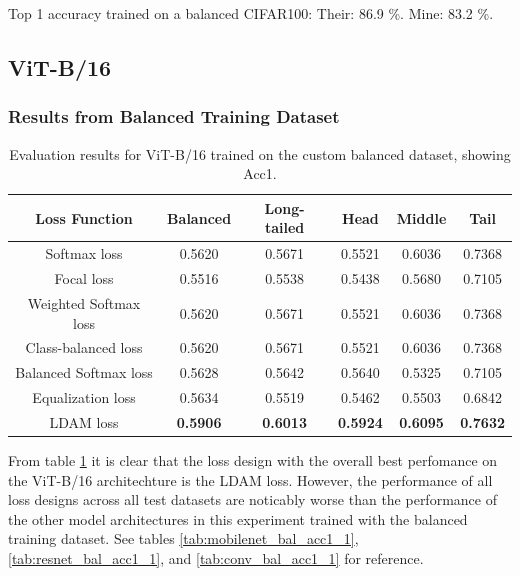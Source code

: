 Top 1 accuracy trained on a balanced CIFAR100:
Their: 86.9 \%.
Mine: 83.2 \%.


\subsection{ViT-B/16}

\subsubsection{Results from Balanced Training Dataset}

\begin{table}[H]
    \centering
    \caption{Evaluation results for ViT-B/16 trained on the custom balanced dataset, showing Acc1.}
    \begin{tabular}{cccccc}
        \toprule
        Loss Function & Balanced & Long-tailed & Head & Middle & Tail \\ 
        \midrule
        Softmax loss   & 0.5620 & 0.5671 & 0.5521 & 0.6036 & 0.7368 \\
        Focal loss   & 0.5516 & 0.5538 & 0.5438 & 0.5680 & 0.7105 \\
        Weighted Softmax loss   & 0.5620 & 0.5671 & 0.5521 & 0.6036 & 0.7368 \\
        Class-balanced loss   & 0.5620 & 0.5671 &  0.5521 & 0.6036 & 0.7368 \\
        Balanced Softmax loss   & 0.5628 & 0.5642 & 0.5640 & 0.5325 & 0.7105 \\
        Equalization loss   & 0.5634   & 0.5519 & 0.5462 & 0.5503 & 0.6842 \\
        LDAM loss   & \textbf{0.5906} &  \textbf{0.6013} & \textbf{0.5924} & \textbf{0.6095} & \textbf{0.7632} \\
        \bottomrule
    \end{tabular}
    \label{tab:vit_bal_acc1_1}
\end{table}

From table \ref{tab:vit_bal_acc1_1} it is clear that the loss design with the overall best perfomance on the ViT-B/16 architechture is the LDAM loss. However, the performance of all loss designs across all test datasets are noticably worse than the performance of the other model architectures in this experiment trained with the balanced training dataset. See tables \ref{tab:mobilenet_bal_acc1_1}, \ref{tab:resnet_bal_acc1_1}, and \ref{tab:conv_bal_acc1_1} for reference.  

